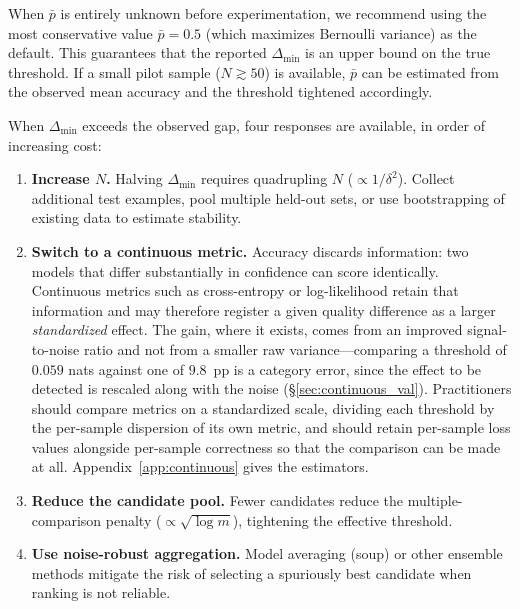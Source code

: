 \documentclass[pdflatex,sn-mathphys-ay,iicol]{sn-jnl}
\theoremstyle{thmstylethree}
\begin{document}
\begin{table}[t]
When $\bar{p}$ is entirely unknown before experimentation, we recommend using the most conservative value $\bar{p}=0.5$ (which maximizes Bernoulli variance) as the default. This guarantees that the reported $\Delta_{\min}$ is an upper bound on the true threshold. If a small pilot sample ($N\gtrsim50$) is available, $\bar{p}$ can be estimated from the observed mean accuracy and the threshold tightened accordingly.

When $\Delta_{\min}$ exceeds the observed gap, four responses are available, in order of increasing cost:
\begin{enumerate}
    \item \textbf{Increase $N$.} Halving $\Delta_{\min}$ requires quadrupling $N$ ($\propto 1/\delta^2$). Collect additional test examples, pool multiple held-out sets, or use bootstrapping of existing data to estimate stability.
    \item \textbf{Switch to a continuous metric.} Accuracy discards information: two models that differ substantially in confidence can score identically. Continuous metrics such as cross-entropy or log-likelihood retain that information and may therefore register a given quality difference as a larger \emph{standardized} effect. The gain, where it exists, comes from an improved signal-to-noise ratio and not from a smaller raw variance---comparing a threshold of $0.059$ nats against one of $9.8$~pp is a category error, since the effect to be detected is rescaled along with the noise (\S\ref{sec:continuous_val}). Practitioners should compare metrics on a standardized scale, dividing each threshold by the per-sample dispersion of its own metric, and should retain per-sample loss values alongside per-sample correctness so that the comparison can be made at all. Appendix~\ref{app:continuous} gives the estimators.
    \item \textbf{Reduce the candidate pool.} Fewer candidates reduce the multiple-comparison penalty ($\propto\sqrt{\log m}$), tightening the effective threshold.
    \item \textbf{Use noise-robust aggregation.} Model averaging (soup) or other ensemble methods mitigate the risk of selecting a spuriously best candidate when ranking is not reliable.
\end{enumerate}


\end{table}
\end{document}
